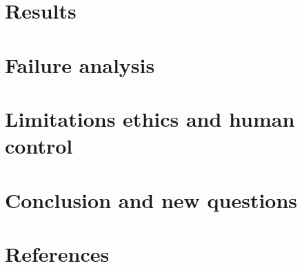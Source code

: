 \documentclass[11pt,a4paper]{article}
\begin{document}
\section{Results}

\section{Failure analysis}

\section{Limitations ethics and human control}

\section{Conclusion and new questions}

\section*{References}
\end{document}
